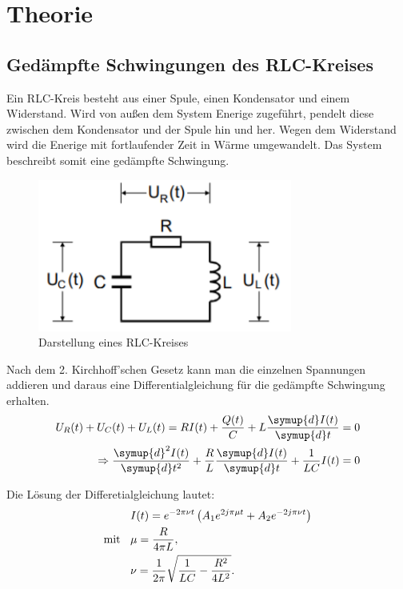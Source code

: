 \section{Theorie}
\label{sec:Theorie}

\subsection{Gedämpfte Schwingungen des RLC-Kreises}
Ein RLC-Kreis besteht aus einer Spule, einen Kondensator und einem Widerstand. Wird von außen
dem System Enerige zugeführt, pendelt diese zwischen dem Kondensator und der Spule hin und her.
Wegen dem Widerstand wird die Enerige mit fortlaufender Zeit in Wärme umgewandelt. Das System beschreibt
somit eine gedämpfte Schwingung.

\begin{figure}[H]
  \centering
  \includegraphics[height=5cm]{RLC-Kreis(Grundsaetzlich).PNG}
  \caption{Darstellung eines RLC-Kreises}
  \label{fig:RLC-Kreis(mit Widerstand)}
\end{figure}

Nach dem 2. Kirchhoff'schen Gesetz kann man die einzelnen Spannungen addieren und daraus eine Differentialgleichung
für die gedämpfte Schwingung erhalten.
\begin{align}
  U_R(t) + U_C(t) + U_L(t) = RI(t) +\frac{Q(t)}{C} + L\frac{\symup{d}I(t)}{\symup{d}t} = 0 \\
  \Rightarrow \frac{\symup{d}^2I(t)}{\symup{d}t^2} +\frac{R}{L}\frac{\symup{d}I(t)}{\symup{d}t} + \frac{1}{LC}I(t) = 0
\end{align}

Die Lösung der Differetialgleichung lautet:
\begin{align}
  &I(t) = e^{-2\pi \nu t} \left(A_1 e^{2j\pi \mu t} + A_2 e^{-2j\pi \nu t}\right)   \\
\text{mit} \:\:\:\:  &\mu = \frac{R}{4\pi L} \notag, \\
  &\nu = \frac{1}{2\pi} \sqrt{\frac{1}{LC} - \frac{R^2}{4L^2}} \notag.
\end{align}

